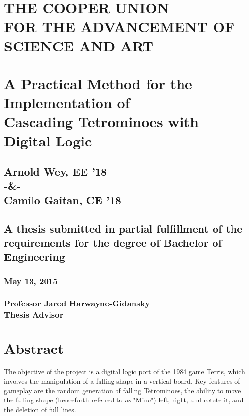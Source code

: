 \documentclass[letterpaper,titlepage,oneside]{article}
\begin{document}
\begin{center}
\section*{THE COOPER UNION \\FOR THE ADVANCEMENT OF SCIENCE AND ART\\[35pt]}
\section*{A Practical Method for the Implementation of \\Cascading Tetrominoes with Digital Logic\\[35pt]}
\subsection*{Arnold Wey, EE '18 \\[15pt]-\&-\\[15pt] Camilo Gaitan, CE '18\\[75pt]}
\subsection*{A thesis submitted in partial fulfillment of the requirements for the degree of Bachelor of Engineering\\[75pt]}
\subsubsection*{May 13, 2015\\[60pt]}
\subsubsection*{Professor Jared Harwayne-Gidansky\\[5pt]Thesis Advisor}
\end{center}
\pagebreak
\tableofcontents
\pagebreak
\pagestyle{headings}
\section{Abstract}
The objective of the project is a digital logic port of the 1984 game Tetris, which involves the manipulation of a falling shape in a vertical board. Key features of gameplay are the random generation of falling Tetrominoes, the ability to move the falling shape (henceforth referred to as "Mino") left, right, and rotate it, and the deletion of full lines. 
\end{document}
